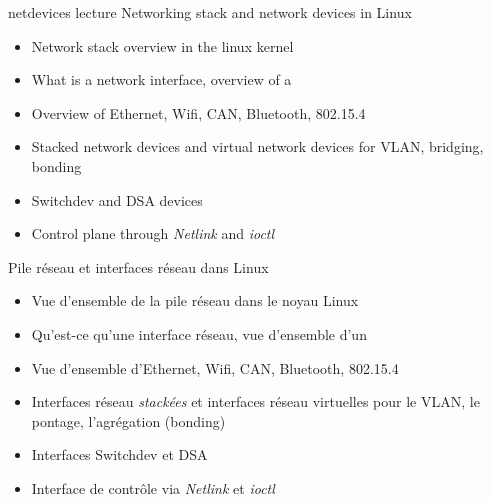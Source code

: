 \def \trainingprerequisites{
  \begin{itemize}
    \prerequisiteembeddedlinux
    \prerequisitekernel
    \prerequisiteenglish
  \end{itemize}
}


\def \trainers {maxime-chevallier}

\def \onsitelecturetimeratio{50}
\def \onsitelabtimeratio{50}

{netdevices}
{lecture}
{Networking stack and network devices in Linux}
{
  \begin{itemize}
  \item Network stack overview in the linux kernel
  \item What is a network interface, overview of a 
  \item Overview of Ethernet, Wifi, CAN, Bluetooth, 802.15.4
  \item Stacked network devices and virtual network devices for VLAN,
    bridging, bonding
  \item Switchdev and DSA devices
  \item Control plane through {\em Netlink} and {\em ioctl}
  \end{itemize}
}
{Pile réseau et interfaces réseau dans Linux}
{
  \begin{itemize}
  \item Vue d'ensemble de la pile réseau dans le noyau Linux
  \item Qu'est-ce qu'une interface réseau, vue d'ensemble d'un 
  \item Vue d'ensemble d'Ethernet, Wifi, CAN, Bluetooth, 802.15.4
  \item Interfaces réseau {\em stackées} et interfaces réseau
    virtuelles pour le VLAN, le pontage, l'agrégation (bonding)
  \item Interfaces Switchdev et DSA
  \item Interface de contrôle via {\em Netlink} et {\em ioctl}
  \end{itemize}
}

